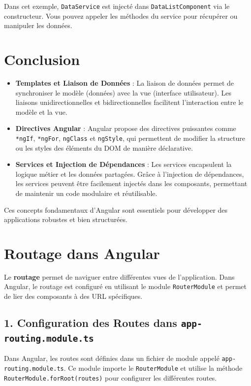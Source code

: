 \documentclass{article}
\begin{document}
Dans cet exemple, \texttt{DataService} est injecté dans \texttt{DataListComponent} via le constructeur. Vous pouvez appeler les méthodes du service pour récupérer ou manipuler les données. 

\section{Conclusion}

\begin{itemize}
  \item \textbf{Templates et Liaison de Données} : La liaison de données permet de synchroniser le modèle (données) avec la vue (interface utilisateur). Les liaisons unidirectionnelles et bidirectionnelles facilitent l’interaction entre le modèle et la vue.
  \item \textbf{Directives Angular} : Angular propose des directives puissantes comme \texttt{*ngIf}, \texttt{*ngFor}, \texttt{ngClass} et \texttt{ngStyle}, qui permettent de modifier la structure ou les styles des éléments du DOM de manière déclarative.
  \item \textbf{Services et Injection de Dépendances} : Les services encapsulent la logique métier et les données partagées. Grâce à l'injection de dépendances, les services peuvent être facilement injectés dans les composants, permettant de maintenir un code modulaire et réutilisable.
\end{itemize}

Ces concepts fondamentaux d'Angular sont essentiels pour développer des applications robustes et bien structurées.


\section*{Routage dans Angular}

Le \textbf{routage} permet de naviguer entre différentes vues de l'application. Dans Angular, le routage est configuré en utilisant le module \texttt{RouterModule} et permet de lier des composants à des URL spécifiques.

\subsection*{1. Configuration des Routes dans \texttt{app-routing.module.ts}}

Dans Angular, les routes sont définies dans un fichier de module appelé \texttt{app-routing.module.ts}. Ce module importe le \texttt{RouterModule} et utilise la méthode \texttt{RouterModule.forRoot(routes)} pour configurer les différentes routes.
\end{document}
